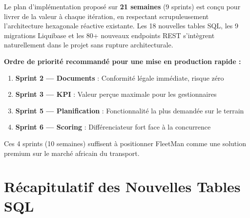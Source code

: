 \documentclass[12pt,a4paper]{report}
\begin{document}
Le plan d'implémentation proposé sur \textbf{21 semaines} (9 sprints) est conçu pour livrer de la valeur à chaque itération, en respectant scrupuleusement l'architecture hexagonale réactive existante. Les 18 nouvelles tables SQL, les 9 migrations Liquibase et les 80+ nouveaux endpoints REST s'intègrent naturellement dans le projet sans rupture architecturale.

\begin{tcolorbox}[colback=fleetblue!8, colframe=fleetblue, title={\bfseries Recommandation Finale}]
\textbf{Ordre de priorité recommandé pour une mise en production rapide :}

\begin{enumerate}[leftmargin=1.5cm]
  \item \textbf{Sprint 2 — Documents} : Conformité légale immédiate, risque zéro
  \item \textbf{Sprint 3 — KPI} : Valeur perçue maximale pour les gestionnaires
  \item \textbf{Sprint 5 — Planification} : Fonctionnalité la plus demandée sur le terrain
  \item \textbf{Sprint 6 — Scoring} : Différenciateur fort face à la concurrence
\end{enumerate}

Ces 4 sprints (10 semaines) suffisent à positionner FleetMan comme une solution premium sur le marché africain du transport.
\end{tcolorbox}

\appendix

\chapter{Récapitulatif des Nouvelles Tables SQL}
\end{document}
